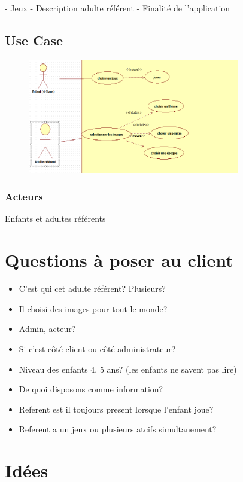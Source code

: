 \documentclass[12pt,a4paper]{report}
\begin{document}
- Jeux
- Description adulte référent
- Finalité de l'application



\section{Use Case}
\begin{figure}[!h]
 \centering
 \includegraphics[width=350px]{uml.png}
\end{figure}

\subsection{Acteurs}
Enfants et adultes référents

\chapter{Questions à poser au client}

\begin{itemize}
\item C'est qui cet adulte référent? Plusieurs?
\item Il choisi des images pour tout le monde?
\item Admin, acteur? 
\item Si c'est côté client ou côté administrateur? 
\item Niveau des enfants 4, 5 ans? (les enfants ne savent pas lire)
\item De quoi disposons comme information?
\item Referent est il toujours present lorsque l'enfant joue?
\item Referent a un jeux ou plusieurs atcifs simultanement?
\end{itemize}

\chapter{Idées}
\end{document}
